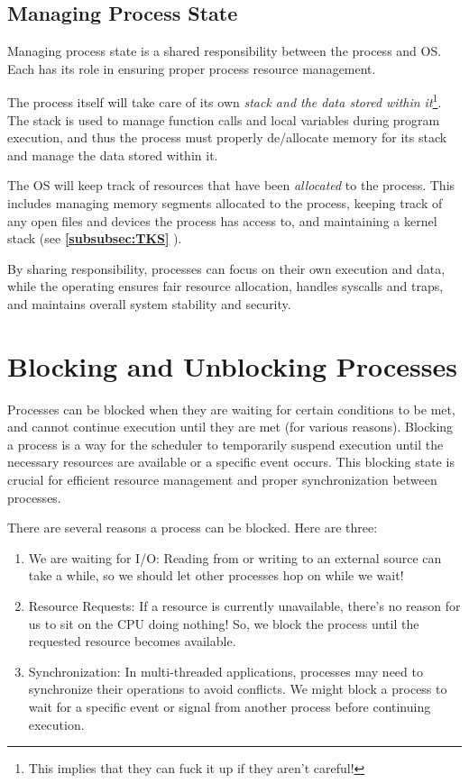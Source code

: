 \documentclass{report}
\newcommand{\exampleBegin}[1]{\begin{tcolorbox}[colback=blue!5!white,colframe=black!75!blue,title={Example:
      #1}]}
\newcommand{\exampleEnd}{\end{tcolorbox}}
\newcommand{\refto}[2]{\textbf{\ref{#1:#2} \nameref{#1:#2}}}
\begin{document}
\subsection{Managing Process State}
Managing process state is a shared responsibility between the process and OS. Each has its role in
ensuring proper process resource management.

The process itself will take care of its own \textit{stack and the data stored within
  it}\footnote{This implies that they can fuck it up if they aren't careful!}. The stack
is used to manage function calls and local variables during program execution, and thus the process
must properly de/allocate memory for its stack and manage the data stored within it.

The OS will keep track of resources that have been \textit{allocated} to the process. This includes
managing memory segments allocated to the process, keeping track of any open files and devices the
process has access to, and maintaining a kernel stack (see  \refto{subsubsec}{TKS}).

By sharing responsibility, processes can focus on their own execution and data, while the operating
ensures fair resource allocation, handles syscalls and traps, and maintains overall system stability
and security.





\section{Blocking and Unblocking Processes}
Processes can be blocked when they are waiting for certain conditions to be met, and cannot continue
execution until they are met (for various reasons). Blocking a process is a way for the scheduler to
temporarily suspend execution until the necessary resources are available or a specific event
occurs. This blocking state is crucial for efficient resource management and proper synchronization
between processes.

\exampleBegin{Unblock Me!}
There are several reasons a process can be blocked. Here are three:
\begin{enumerate}[label=\textit{(\roman*)}]
\item We are waiting for I/O: Reading from or writing to an external source can take a while, so we
  should let other processes hop on while we wait!
\item Resource Requests: If a resource is currently unavailable, there's no reason for us to sit on
  the CPU doing nothing! So, we block the process until the requested resource becomes available.
\item Synchronization: In multi-threaded applications, processes may need to synchronize their
  operations to avoid conflicts. We might block a process to wait for a specific event or signal
  from another process before continuing execution.
\end{enumerate}
\exampleEnd
\end{document}
